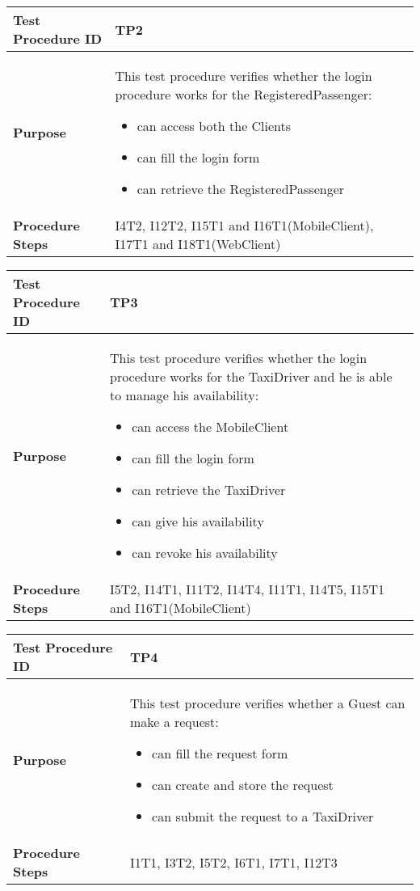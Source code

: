 			\vspace{1cm}
			\begin{tabular}{p{4cm} | p{8cm}} \hline
				\textbf{Test Procedure ID} & TP2 \\ \hline
				\textbf{Purpose} & This test procedure verifies whether the login procedure works
					for the RegisteredPassenger:
					\begin{itemize}
						\item can access both the Clients
						\item can fill the login form
						\item can retrieve the RegisteredPassenger
					\end{itemize}
				\\ \hline
				\textbf{Procedure Steps} & I4T2, I12T2, I15T1 and I16T1(MobileClient), I17T1 and I18T1(WebClient)\\ \hline
			\end{tabular}
			\vspace{1cm}
			\begin{tabular}{p{4cm} | p{8cm}} \hline
				\textbf{Test Procedure ID} & TP3 \\ \hline
				\textbf{Purpose} & This test procedure verifies whether the login procedure works
				for the TaxiDriver and he is able to manage his availability:
				\begin{itemize}
					\item can access the MobileClient
					\item can fill the login form
					\item can retrieve the TaxiDriver
					\item can give his availability
					\item can revoke his availability
				\end{itemize}
				\\ \hline
				\textbf{Procedure Steps} & I5T2, I14T1, I11T2, I14T4, I11T1, I14T5, I15T1 and I16T1(MobileClient) \\ \hline
			\end{tabular}
			\vspace{1cm}
			\begin{tabular}{p{4cm} | p{8cm}} \hline
				\textbf{Test Procedure ID} & TP4 \\ \hline
				\textbf{Purpose} & This test procedure verifies whether a Guest can make a request:
				\begin{itemize}
					\item can fill the request form
					\item can create and store the request
					\item can submit the request to a TaxiDriver
				\end{itemize}
				\\ \hline
				\textbf{Procedure Steps} & I1T1, I3T2, I5T2, I6T1, I7T1, I12T3 \\ \hline
			\end{tabular}
